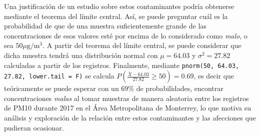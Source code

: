 \documentclass[paper=leter, fontsize=11pt]{scrartcl}
\begin{document}
Una justificación de un estudio sobre estos contaminantes podría obtenerse mediante el teorema del límite central. Así, se puede preguntar cuál es la probabilidad de que de una muestra suficientemente grande de las concentraciones de esos valores esté por encima de lo considerado como \emph{malo}, o sea $50 \mu\text{g} / \text{m}^3$. A partir del teorema del límite central, se puede considerar que dicha muestra tendrá una distribución normal con $\mu = 64.03$ y $\sigma^2 = 27.82$ calculadas a partir de los registros. Finalmente, mediante \texttt{pnorm(50, 64.03, 27.82, lower.tail = F)} se calcula $P\left(\frac{\bar{X} - 64.03}{27.82} \geq 50\right) = 0.69$, es decir que teóricamente se puede esperar con un $69\%$ de probabilidades, encontrar concentraciones \emph{malas} al tomar muestras de manera aleatoria entre los registros de PM10 durante 2017 en el Área Metropolitana de Monterrey, lo que motiva su análisis y exploración de la relación entre estos contaminantes y las afecciones que pudieran ocasionar.



\end{document}
